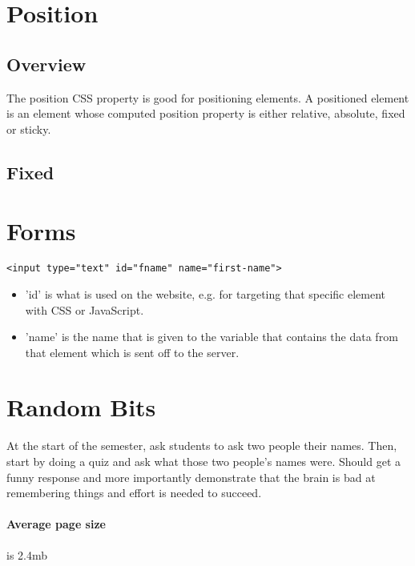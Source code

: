 \documentclass[]{article}
\begin{document}
\section{Position}
\subsection{Overview}
The position CSS property is good for positioning elements. A positioned element is an element whose computed position property is either relative, absolute, fixed or sticky. 

\subsection{Fixed}


\section{Forms}
\begin{lstlisting}
<input type="text" id="fname" name="first-name">
\end{lstlisting}
\begin{itemize}
	\item 'id' is what is used on the website, e.g. for targeting that specific element with CSS or JavaScript.
	\item 'name' is the name that is given to the variable that contains the data from that element which is sent off to the server.
\end{itemize}


\section{Random Bits}
At the start of the semester, ask students to ask two people their names.  Then, start by doing a quiz and ask what those two people's names were.  Should get a funny response and more importantly demonstrate that the brain is bad at remembering things and effort is needed to succeed.

\paragraph{Average page size} is 2.4mb 
\end{document}
